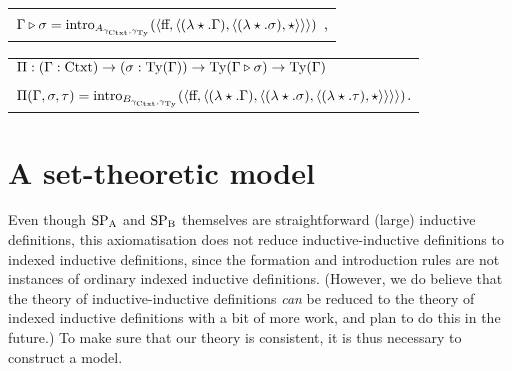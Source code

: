 \documentclass{article}
\begin{document}
\begin{description}
\begin{tabular}{l}
  $\Gamma \triangleright \sigma = \text{intro}_{A_{\gamma_{\text{Ctxt}}, \gamma_{\text{Ty}}}}(\langle \text{ff}, \langle (\lambda \star.\Gamma), \langle (\lambda \star.\sigma), \star\rangle \rangle\rangle)$ \enspace ,\\
\end{tabular}
\vskip 0.2cm
\begin{tabular}{l}
$\Pi : (\Gamma : \text{Ctxt}) \to (\sigma : \text{Ty}(\Gamma)) \to \text{Ty}(\Gamma \triangleright \sigma) \to
\text{Ty}(\Gamma)$ \\
$\Pi(\Gamma, \sigma, \tau) = \text{intro}_{B_{\gamma_{\text{Ctxt}}, \gamma_{\text{Ty}}}}(\langle \text{ff}, \langle (\lambda
    \star.\Gamma), \langle (\lambda \star.\sigma),\langle (\lambda \star. \tau) , \star\rangle\rangle \rangle\rangle)$\enspace .
\end{tabular}











\end{description}

\section{A set-theoretic model}
\label{sec:model}

Even though $\text{SP}_{\mathrm{A}}$ and $\text{SP}_{\mathrm{B}}$ themselves are straightforward (large)
inductive definitions, this axiomatisation does not reduce
inductive-inductive definitions to indexed inductive definitions,
since the formation and introduction rules are not instances of
ordinary indexed inductive definitions.  (However, we do believe that
the theory of inductive-inductive definitions \emph{can} be reduced to
the theory of indexed inductive definitions with a bit of more
work, and plan to do this in the future.) %
To make sure that our theory is consistent, it is thus necessary to
construct a model.
\end{document}
